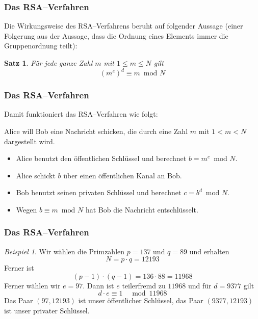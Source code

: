 \documentclass[hyperref={pdfpagelabels=false}]{beamer}
\theoremstyle{plain}%
\newtheorem*{satz}{Satz}
\theoremstyle{definition}
\theoremstyle{remark}
\newtheorem*{beispiel}{Beispiel}
\begin{document}
\begin{frame}
\frametitle{Das RSA--Verfahren}

Die Wirkungsweise des RSA--Verfahrens beruht auf folgender Aussage (einer Folgerung aus der Aussage, 
dass die Ordnung eines Elements immer die Gruppenordnung teilt): 

\begin{satz} Für jede ganze Zahl $m$ mit $1 \leq m \leq N$ gilt 
	$$ \left(m^e\right)^d \equiv m \, \text{ mod } N $$
\end{satz}

\end{frame} 

\begin{frame}
\frametitle{Das RSA--Verfahren}

Damit funktioniert das RSA--Verfahren wie folgt: 

Alice will Bob eine Nachricht schicken, die durch eine Zahl $m$ mit $1 < m < N$ dargestellt wird. 

\begin{itemize}
\item<2-> Alice benutzt den öffentlichen Schlüssel und berechnet $b = m^e \, \text{ mod } N$. 
\item<3-> Alice schickt  $b$ über einen öffentlichen Kanal an Bob. 
\item<4-> Bob benutzt seinen privaten Schlüssel und berechnet $c = b^d \, \text{ mod } N$. 
\item<5-> Wegen $b \equiv m \, \text{ mod } N$ hat Bob die Nachricht entschlüsselt. 
\end{itemize}

\end{frame} 

\begin{frame}
\frametitle{Das RSA--Verfahren}

\begin{beispiel}

Wir wählen die Primzahlen $p=137$ und $q = 89$ und erhalten 
	$$ N = p \cdot q = \num{12193}$$ 
Ferner ist 
	$$ (p-1) \cdot (q-1) = 136 \cdot 88 = \num{11968} $$
Ferner wählen wir $e = 97$. Dann ist $e$ teilerfremd  zu $\num{11968}$ und für $d = 9377$ gilt 
	$$ d \cdot e \equiv 1 \quad \text{ mod } \, \num{11968} $$
Das Paar $(97, \num{12193})$ ist unser öffentlicher Schlüssel, das Paar $(\num{9377}, \num{12193})$ ist unser 
privater Schlüssel.
\end{beispiel}

\end{frame} 
\end{document}
